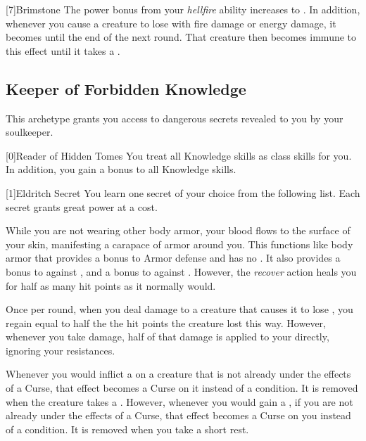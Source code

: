         [7]{Brimstone} The power bonus from your \textit{hellfire} ability increases to .
        In addition, whenever you cause a creature to lose  with fire damage or energy damage, it becomes \sickened until the end of the next round.
        That creature then becomes immune to this effect until it takes a .

    \newpage
    \subsection{Keeper of Forbidden Knowledge}
        This archetype grants you access to dangerous secrets revealed to you by your soulkeeper.

        [0]{Reader of Hidden Tomes} You treat all Knowledge skills as class skills for you.
        In addition, you gain a  bonus to all Knowledge skills.

        [1]{Eldritch Secret} You learn one secret of your choice from the following list.
        Each secret grants great power at a cost.
        {
             While you are not wearing other body armor, your blood flows to the surface of your skin, manifesting a carapace of armor around you.
            This functions like body armor that provides a  bonus to Armor defense and has no .
            It also provides a  bonus to  against , and a  bonus to  against .
            However, the \textit{recover} action heals you for half as many hit points as it normally would.

             Once per round, when you deal damage to a creature that causes it to lose , you regain  equal to half the the hit points the creature lost this way.
            However, whenever you take damage, half of that damage is applied to your  directly, ignoring your resistances.

             Whenever you would inflict a  on a creature that is not already under the effects of a Curse, that effect becomes a Curse on it instead of a condition.
            It is removed when the creature takes a .
            However, whenever you would gain a , if you are not already under the effects of a Curse, that effect becomes a Curse on you instead of a condition.
            It is removed when you take a short rest.
        }

